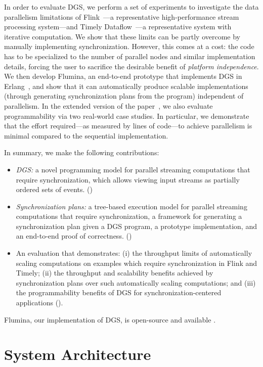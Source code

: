 In order to evaluate DGS, we perform a set of experiments to investigate the data parallelism limitations of Flink~\cite{Flink2015}---a representative high-performance stream processing system---and
Timely Dataflow~\cite{Naiad2013}---a representative system with iterative computation.
We show that these limits can be partly overcome by manually implementing synchronization. However, this comes at a cost: the code has to be specialized
to the number of parallel nodes and similar implementation details, forcing
the user to sacrifice the desirable benefit of \emph{platform independence}.
We then develop Flumina, an end-to-end prototype that implements DGS in Erlang~\cite{armstrong1993erlang}, and show that it can automatically produce scalable implementations (through generating synchronization plans from the program) independent of parallelism.
In the extended version of the paper~,
we also evaluate programmability via two real-world case studies.
In particular,
we demonstrate that the effort required---as measured by lines of code---to achieve parallelism is minimal compared to the sequential implementation.

In summary, we make the following contributions:
\begin{itemize}
\item
\emph{DGS:} a novel programming model for parallel streaming computations that require synchronization, which allows viewing input streams as partially ordered sets of events. ()
\item
\emph{Synchronization plans:} a tree-based execution model for parallel streaming computations that require synchronization, a framework for generating a synchronization plan given a DGS program, a prototype implementation, and an end-to-end proof of correctness.
()
\item
An evaluation that demonstrates: (i) the throughput limits of automatically scaling computations on examples which require synchronization in Flink and Timely; (ii) the throughput and scalability benefits achieved by synchronization plans over such automatically scaling computations; and (iii) the programmability benefits of DGS for synchronization-centered applications
().
\end{itemize}

Flumina, our implementation of DGS, is open-source and available
.

\section{System Architecture}
\label{dgs:ssec:solution-architecture}

